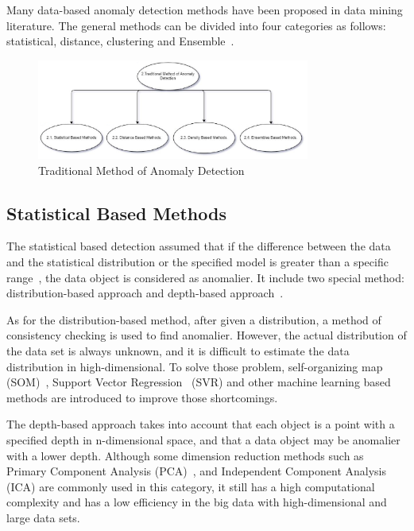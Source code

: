 Many data-based anomaly detection methods have been proposed in
data mining literature.
The general methods can be divided into four categories as follows:
statistical,
distance,
clustering and Ensemble~\cite{cook2019anomaly}.


\begin{figure}
  \centering
  \includegraphics[width=0.80\textwidth]{figures/gif/secpictures/sec2}
  \caption{Traditional Method of Anomaly Detection}\label{sec2}
\end{figure}

\subsection{Statistical Based Methods}

The statistical based detection assumed that
if the difference between the data and the statistical
distribution or the specified model
is greater than a specific range~\cite{chandola2009anomaly},
the data object is considered as anomalier.
It include two special method:
distribution-based approach and
depth-based approach~\cite{wu2016survey}.

As for the distribution-based method,
after given a distribution,
a method of consistency checking is used to find anomalier.
However,
the actual distribution of the data set is always unknown,
and it is difficult to estimate the data distribution in high-dimensional.
To solve those problem,
self-organizing map (SOM)~\cite{siripanadorn2010anomaly},
Support Vector Regression~\cite{kromanis2013support} (SVR) and
other machine learning based methods are introduced to
improve those shortcomings.

The depth-based approach takes into account
that each object is a point with
a specified depth in n-dimensional space,
and that a data object may be anomalier with a lower depth.
Although some dimension reduction methods such as
Primary Component Analysis (PCA)~\cite{deng2013modified},
and Independent Component Analysis (ICA)
are commonly used in this category,
it still has a high computational complexity and
has a low efficiency in the big data with
high-dimensional and large data sets.

